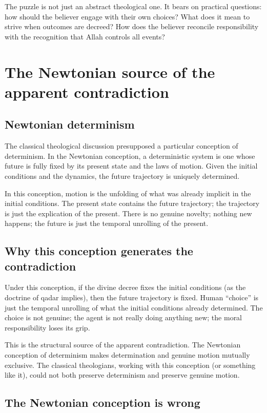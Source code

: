 The puzzle is not just an abstract theological one. It bears on
practical questions: how should the believer engage with their own
choices? What does it mean to strive when outcomes are decreed?
How does the believer reconcile responsibility with the
recognition that Allah controls all events?

\section{The Newtonian source of the apparent contradiction}
\label{sec:qad-newtonian}

\subsection{Newtonian determinism}

The classical theological discussion presupposed a particular
conception of determinism. In the Newtonian conception, a
deterministic system is one whose future is fully fixed by its
present state and the laws of motion. Given the initial conditions
and the dynamics, the future trajectory is uniquely determined.

In this conception, motion is the unfolding of what was already
implicit in the initial conditions. The present state contains the
future trajectory; the trajectory is just the explication of the
present. There is no genuine novelty; nothing new happens; the
future is just the temporal unrolling of the present.

\subsection{Why this conception generates the contradiction}

Under this conception, if the divine decree fixes the initial
conditions (as the doctrine of qadar implies), then the future
trajectory is fixed. Human ``choice'' is just the temporal
unrolling of what the initial conditions already determined. The
choice is not genuine; the agent is not really doing anything new;
the moral responsibility loses its grip.

This is the structural source of the apparent contradiction. The
Newtonian conception of determinism makes determination and
genuine motion mutually exclusive. The classical theologians,
working with this conception (or something like it), could not
both preserve determinism and preserve genuine motion.

\subsection{The Newtonian conception is wrong}

